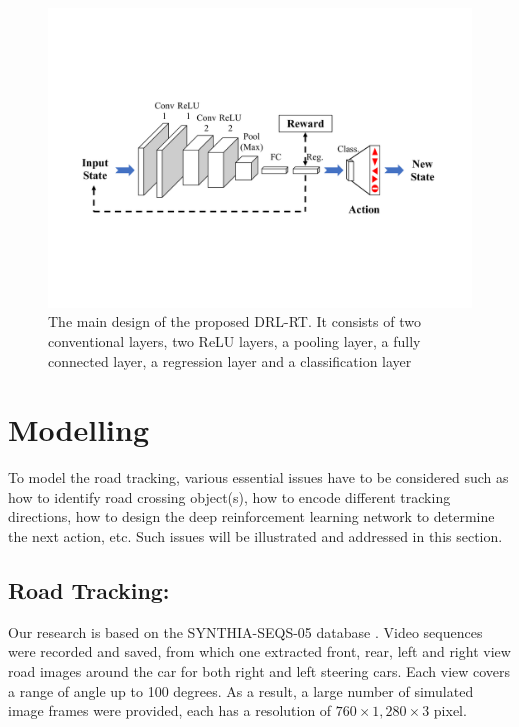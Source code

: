 \documentclass{svproc}
\begin{document}
\begin{figure}[!h]
	\centering
	\includegraphics[scale=.5,trim=2cm 5.5cm 2cm 5.5cm,clip]{Deep_Reinf_Net1.pdf}
	\caption{The main design of the proposed DRL-RT. It consists of two conventional layers, two ReLU layers, a pooling layer, a fully connected layer, a regression layer and a classification layer}
	\label{Fig:Deep_Reinf_Net}
\end{figure}


\section{Modelling}
To model the road tracking, various essential issues have to be considered such as how to identify road crossing object(s), how to encode different tracking directions, how to design the deep reinforcement learning network to determine the next action, etc. Such issues will be illustrated and addressed in this section.

\subsection{Road Tracking:} 
Our research is based on the SYNTHIA-SEQS-05 database \cite{Ros2016TheSYNTHIA}. Video sequences were recorded and saved, from which one extracted front,  rear, left and right view road images around the car for both right and left steering cars. Each view covers a range of angle up to 100 degrees. As a result, a large number of simulated image frames were provided, each has a resolution of $760 \times 1,280 \times 3$ pixel. 
\end{document}
